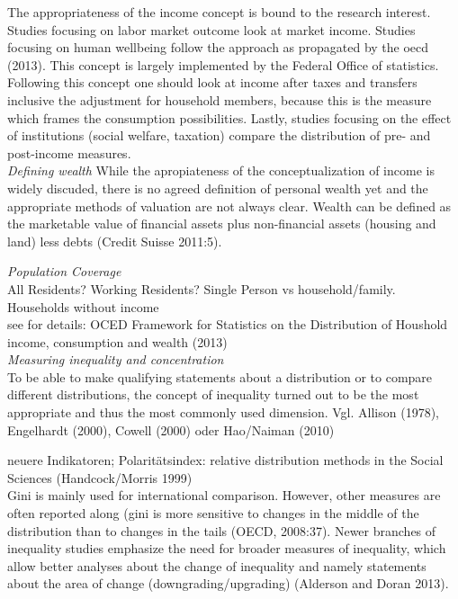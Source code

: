 The appropriateness of the income concept is bound to the research interest. Studies focusing on labor market outcome look at market income. Studies focusing on human wellbeing follow the approach as propagated by the oecd (2013). This concept is largely implemented by the Federal Office of statistics. Following this concept one should look at income after taxes and transfers inclusive the adjustment for household members, because this is the measure which frames the consumption possibilities. Lastly, studies focusing on the effect of institutions (social welfare, taxation) compare the distribution of pre- and post-income measures. \\   

\emph{Defining wealth}
While the apropiateness of the conceptualization of income is widely discuded, there is no agreed definition of personal wealth yet and the appropriate methods of valuation are not always clear. 
Wealth can be defined as the marketable value of financial assets plus non-financial assets (housing and land) less debts (Credit Suisse 2011:5).

\emph{Population Coverage} \\
All Residents? Working Residents? Single Person vs household/family. Households without income \\
see for details: OCED Framework for Statistics on the Distribution of Houshold income, consumption and wealth (2013) \\

\emph{Measuring inequality and concentration} \\
To be able to make qualifying statements about a distribution or to compare different distributions, the concept of inequality turned out to be the most appropriate and thus the most commonly used dimension. Vgl. Allison (1978), Engelhardt (2000), Cowell (2000) oder Hao/Naiman (2010)

neuere Indikatoren; Polaritätsindex: relative distribution methods in the Social Sciences (Handcock/Morris 1999) \\

Gini is mainly used for international comparison. However, other measures are often reported along (gini is more sensitive to changes in the middle of the distribution than to changes in the tails (OECD, 2008:37). Newer branches of inequality studies emphasize the need for broader measures of inequality, which allow better analyses about the change of inequality and namely statements about the area of change (downgrading/upgrading) (Alderson and Doran 2013). \\

